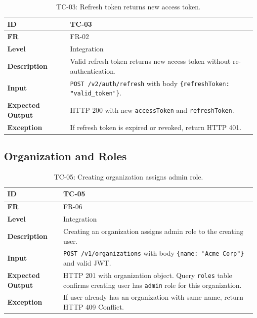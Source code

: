 \documentclass[a4paper]{article}
\begin{document}
\begin{table}[H]
\centering
\caption{TC-03: Refresh token returns new access token.}
\begin{tabular}{|p{3cm}|p{10.5cm}|}
\hline
\textbf{ID} & TC-03 \\
\hline
\textbf{FR} & FR-02 \\
\hline
\textbf{Level} & Integration \\
\hline
\textbf{Description} & Valid refresh token returns new access token without re-authentication. \\
\hline
\textbf{Input} & \texttt{POST /v2/auth/refresh} with body \texttt{\{refreshToken: "valid\_token"\}}. \\
\hline
\textbf{Expected Output} & HTTP 200 with new \texttt{accessToken} and \texttt{refreshToken}. \\
\hline
\textbf{Exception} & If refresh token is expired or revoked, return HTTP 401. \\
\hline
\end{tabular}
\small
\end{table}

\subsection{Organization and Roles}

\begin{table}[H]
\centering
\caption{TC-05: Creating organization assigns admin role.}
\begin{tabular}{|p{3cm}|p{10.5cm}|}
\hline
\textbf{ID} & TC-05 \\
\hline
\textbf{FR} & FR-06 \\
\hline
\textbf{Level} & Integration \\
\hline
\textbf{Description} & Creating an organization assigns admin role to the creating user. \\
\hline
\textbf{Input} & \texttt{POST /v1/organizations} with body \texttt{\{name: "Acme Corp"\}} and valid JWT. \\
\hline
\textbf{Expected Output} & HTTP 201 with organization object. Query \texttt{roles} table confirms creating user has \texttt{admin} role for this organization. \\
\hline
\textbf{Exception} & If user already has an organization with same name, return HTTP 409 Conflict. \\
\hline
\end{tabular}
\small
\end{table}
\end{document}
